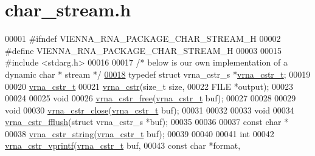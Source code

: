 \hypertarget{char__stream_8h_source}{}\section{char\+\_\+stream.\+h}
\label{char__stream_8h_source}

\begin{DoxyCode}
00001 \textcolor{preprocessor}{#ifndef VIENNA\_RNA\_PACKAGE\_CHAR\_STREAM\_H}
00002 \textcolor{preprocessor}{#define VIENNA\_RNA\_PACKAGE\_CHAR\_STREAM\_H}
00003 
00015 \textcolor{preprocessor}{#include <stdarg.h>}
00016 
00017 \textcolor{comment}{/* below is our own implementation of a dynamic char * stream */}
\mbox{\hyperlink{group__buffer__utils_ga445bbbcfca238a956bbc11862892adc8}{00018}} \textcolor{keyword}{typedef} \textcolor{keyword}{struct }vrna\_cstr\_s *\mbox{\hyperlink{group__buffer__utils_ga445bbbcfca238a956bbc11862892adc8}{vrna\_cstr\_t}};
00019 
00020 \mbox{\hyperlink{group__buffer__utils_ga445bbbcfca238a956bbc11862892adc8}{vrna\_cstr\_t}}
00021 \mbox{\hyperlink{group__buffer__utils_gadb2818f368e10a3b60a96bb3c80228d2}{vrna\_cstr}}(\textcolor{keywordtype}{size\_t}  size,
00022           FILE    *output);
00023 
00024 
00025 \textcolor{keywordtype}{void}
00026 \mbox{\hyperlink{group__buffer__utils_ga7ec48ec280f699928c70428cc245dc77}{vrna\_cstr\_free}}(\mbox{\hyperlink{group__buffer__utils_ga445bbbcfca238a956bbc11862892adc8}{vrna\_cstr\_t}} buf);
00027 
00028 
00029 \textcolor{keywordtype}{void}
00030 \mbox{\hyperlink{group__buffer__utils_ga5a3f6a0a73b3d2d38fe011cdaed0ad28}{vrna\_cstr\_close}}(\mbox{\hyperlink{group__buffer__utils_ga445bbbcfca238a956bbc11862892adc8}{vrna\_cstr\_t}} buf);
00031 
00032 
00033 \textcolor{keywordtype}{void}
00034 \mbox{\hyperlink{group__buffer__utils_gab59ad4781f7de960bdd1af5b1965c94b}{vrna\_cstr\_fflush}}(\textcolor{keyword}{struct} vrna\_cstr\_s *buf);
00035 
00036 
00037 \textcolor{keyword}{const} \textcolor{keywordtype}{char} *
00038 \mbox{\hyperlink{group__buffer__utils_ga05a1326d7fe8250cb81899f3f875531e}{vrna\_cstr\_string}}(\mbox{\hyperlink{group__buffer__utils_ga445bbbcfca238a956bbc11862892adc8}{vrna\_cstr\_t}} buf);
00039 
00040 
00041 \textcolor{keywordtype}{int}
00042 \mbox{\hyperlink{group__buffer__utils_ga35fdc69cf004aa57784f1764a31b20a6}{vrna\_cstr\_vprintf}}(\mbox{\hyperlink{group__buffer__utils_ga445bbbcfca238a956bbc11862892adc8}{vrna\_cstr\_t}} buf,
00043                   \textcolor{keyword}{const} \textcolor{keywordtype}{char}  *format,

\end{DoxyCode}

